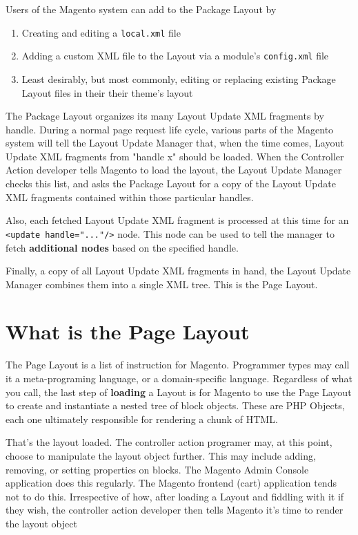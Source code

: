 \documentclass[oneside]{book}
\begin{document}
Users of the Magento system can add to the Package Layout by

\begin{enumerate}
\item Creating and editing a \footnotesize\texttt{local.xml} \normalsize  file
\item Adding a custom XML file to the Layout via a module's \footnotesize\texttt{config.xml} \normalsize  file
\item Least desirably, but most commonly, editing or replacing existing Package Layout files in their their theme's layout
\end{enumerate}


The Package Layout organizes its many Layout Update XML fragments by handle.    During a normal page request life cycle, various parts of the Magento system will tell the Layout Update Manager that, when the time comes, Layout Update XML fragments from "handle x" should be loaded.  When the Controller Action developer tells Magento to load the layout, the Layout Update Manager checks this list, and asks the Package Layout for a copy of the Layout Update XML fragments contained within those particular handles.

Also, each fetched Layout Update XML fragment is processed at this time for an \footnotesize\texttt{\textless update handle="..."/\textgreater } \normalsize  node.  This node can be used to tell the manager to fetch \textbf{additional nodes} based on the specified handle.

Finally, a copy of all Layout Update XML fragments in hand, the Layout Update Manager combines them into a single XML tree.   This is the Page Layout.

\section{What is the Page Layout}

The Page Layout is a list of instruction for Magento.  Programmer types may call it a meta-programing language, or a domain-specific language.  Regardless of what you call, the last step of \textbf{loading} a Layout is for Magento to use the Page Layout to create and instantiate a nested tree of block objects.  These are PHP Objects, each one ultimately responsible for rendering a chunk of HTML.

That's the layout loaded.  The controller action programer may, at this point, choose to manipulate the layout object further.  This may include adding, removing, or setting properties on blocks.  The Magento Admin Console application does this regularly.  The Magento frontend (cart) application tends not to do this.  Irrespective of how, after loading a Layout and fiddling with it if they wish, the controller action developer then tells Magento it's time to render the layout object
\end{document}
